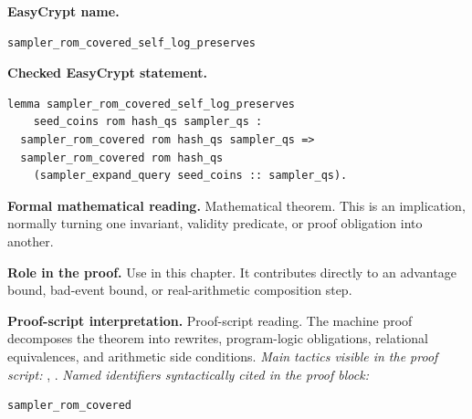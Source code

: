 \begin{formaltheorem}
\noindent\textbf{EasyCrypt name.}
\begin{lstlisting}[language=EasyCrypt,basicstyle=\ttfamily\scriptsize]
sampler_rom_covered_self_log_preserves
\end{lstlisting}
\noindent\textbf{Checked EasyCrypt statement.}
\begin{lstlisting}[language=EasyCrypt,basicstyle=\ttfamily\scriptsize]
lemma sampler_rom_covered_self_log_preserves
    seed_coins rom hash_qs sampler_qs :
  sampler_rom_covered rom hash_qs sampler_qs =>
  sampler_rom_covered rom hash_qs
    (sampler_expand_query seed_coins :: sampler_qs).
\end{lstlisting}
\noindent\textbf{Formal mathematical reading.}
Mathematical theorem. This is an implication, normally turning one invariant, validity predicate, or proof obligation into another.

\noindent\textbf{Role in the proof.}
Use in this chapter. It contributes directly to an advantage bound, bad-event bound, or real-arithmetic composition step.

\noindent\textbf{Proof-script interpretation.}
Proof-script reading. The machine proof decomposes the theorem into rewrites, program-logic obligations, relational equivalences, and arithmetic side conditions.
\emph{Main tactics visible in the proof script:} , .
\emph{Named identifiers syntactically cited in the proof block:}
\begin{lstlisting}[language=EasyCrypt,basicstyle=\ttfamily\scriptsize]
sampler_rom_covered
\end{lstlisting}

\end{formaltheorem}


